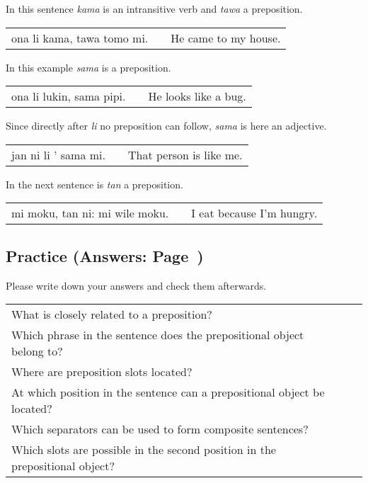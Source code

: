 %
%
In this sentence \textit{kama} is an intransitive verb and \textit{tawa} a preposition.

\begin{supertabular}{p{5,5cm}|ll}
ona li kama, tawa tomo mi. && He came to my house. \\
\end{supertabular} 

%

In this example \textit{sama} is a preposition.

\begin{supertabular}{p{5,5cm}|ll}
ona li lukin, sama pipi. && He looks like a bug. \\
\end{supertabular} 

Since directly after \textit{li} no preposition can follow, \textit{sama} is here an adjective. 

\begin{supertabular}{p{5,5cm}|ll}
jan ni li ' sama mi. && That person is like me. \\
\end{supertabular} 

%

In the next sentence is \textit{tan} a preposition. 

\begin{supertabular}{p{5,5cm}|ll}
mi moku, tan ni: mi wile moku. &&  I eat because I'm hungry. \\
\end{supertabular} 

%
\newpage
\subsection*{Practice (Answers: Page~\pageref{'prepositional_objects'})}
%
Please write down your answers and check them afterwards. 

\begin{supertabular}{p{5,5cm}|ll}
What is closely related to a preposition?  &&  \\ %
Which phrase in the sentence does the prepositional object belong to?  &&   \\ %
Where are preposition slots located?  &&   \\ %
At which position in the sentence can a prepositional object be located? &&  \\ %
Which separators can be used to form composite sentences?  &&   \\ %
Which slots are possible in the second position in the prepositional object?  &&   \\ %
\end{supertabular}

